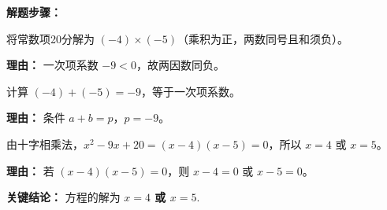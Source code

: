\begin{examplebox}
	\textbf{\textcolor{CExample}{解题步骤：}}
	\begin{description}[style=nextline, leftmargin=2.8em, labelsep=0.5em, itemsep=0.45em]
		\item[\textbf{第一步（分解常数）：}] 将常数项20分解为 $(-4)\times(-5)$（乘积为正，两数同号且和须负）。
			\par\textbf{理由：} 一次项系数 $-9<0$，故两因数同负。
		\item[\textbf{第二步（检验和）：}] 计算 $(-4)+(-5)=-9$，等于一次项系数。
			\par\textbf{理由：} 条件 $a+b=p$，$p=-9$。
		\item[\textbf{第三步（因式分解并求解）：}] 由十字相乘法，$x^2-9x+20=(x-4)(x-5)=0$，所以 $x=4$ 或 $x=5$。
			\par\textbf{理由：} 若 $(x-4)(x-5)=0$，则 $x-4=0$ 或 $x-5=0$。
	\end{description}

	\textbf{\textcolor{CExample}{关键结论：}}
	方程的解为 \textbf{$x=4$ 或 $x=5$}.
\end{examplebox}
